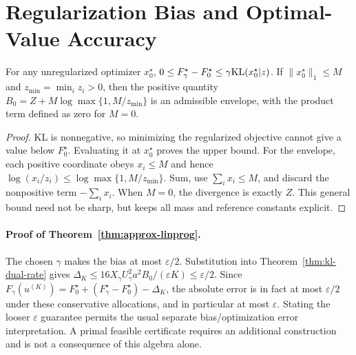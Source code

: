 \section{Regularization Bias and Optimal-Value Accuracy}\label{app-app:kl-bias-runtime}
\begin{lemma}[KL bias]\label{app-lem:kl-bias}
For any unregularized optimizer $x_0^\star$, $0\leq F_\gamma^\star-F_0^\star\leq\gamma\mathrm{KL}(x_0^\star|z)$. If $\|x_0^\star\|_1\leq M$ and $z_{\min}=\min_i z_i>0$, then the positive quantity $B_0=Z+M\log\max\{1,M/z_{\min}\}$ is an admissible envelope, with the product term defined as zero for $M=0$.
\end{lemma}
\begin{proof}
KL is nonnegative, so minimizing the regularized objective cannot give a value below $F_0^\star$. Evaluating it at $x_0^\star$ proves the upper bound. For the envelope, each positive coordinate obeys $x_i\leq M$ and hence $\log(x_i/z_i)\leq\log\max\{1,M/z_{\min}\}$. Sum, use $\sum_i x_i\leq M$, and discard the nonpositive term $-\sum_i x_i$. When $M=0$, the divergence is exactly $Z$. This general bound need not be sharp, but keeps all mass and reference constants explicit.
\end{proof}
\paragraph{Proof of Theorem~\ref{thm:approx-linprog}.}
The chosen $\gamma$ makes the bias at most $\varepsilon/2$. Substitution into Theorem~\ref{thm:kl-dual-rate} gives $\Delta_K\leq16X_\gamma U_\gamma^2a^2B_0/(\varepsilon K)\leq\varepsilon/2$. Since $F_\gamma(u^{(K)})=F_0^\star+(F_\gamma^\star-F_0^\star)-\Delta_K$, the absolute error is in fact at most $\varepsilon/2$ under these conservative allocations, and in particular at most $\varepsilon$. Stating the looser $\varepsilon$ guarantee permits the usual separate bias/optimization error interpretation. A primal feasible certificate requires an additional construction and is not a consequence of this algebra alone.
